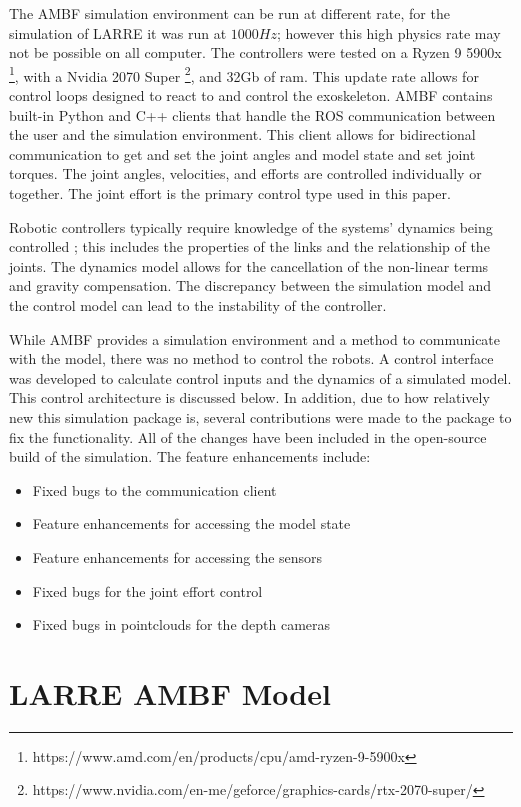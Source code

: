  
  The AMBF simulation environment can be run at different rate, for the simulation of LARRE it was run at $1000Hz$; however this high physics rate may not be possible on all computer. The controllers were tested on a Ryzen 9 5900x \footnote{https://www.amd.com/en/products/cpu/amd-ryzen-9-5900x}, with a Nvidia 2070 Super \footnote{https://www.nvidia.com/en-me/geforce/graphics-cards/rtx-2070-super/}, and 32Gb of ram. This update rate allows for control loops designed to react to and control the exoskeleton. AMBF contains built-in Python and C++ clients that handle the ROS communication between the user and the simulation environment. This client allows for bidirectional communication to get and set the joint angles and model state and set joint torques. The joint angles, velocities, and efforts are controlled individually or together. The joint effort is the primary control type used in this paper. 
 
Robotic controllers typically require knowledge of the systems' dynamics being controlled \cite{piltan2012design}; this includes the properties of the links and the relationship of the joints. The dynamics model allows for the cancellation of the non-linear terms and gravity compensation. The discrepancy between the simulation model and the control model can lead to the instability of the controller. 
 
 While AMBF provides a simulation environment and a method to communicate with the model, there was no method to control the robots. A control interface was developed to calculate control inputs and the dynamics of a simulated model. This control architecture is discussed below. In addition, due to how relatively new this simulation package is, several contributions were made to the package to fix the functionality. All of the changes have been included in the open-source build of the simulation. The feature enhancements include:
 \begin{itemize}
     \item Fixed bugs to the communication client
     \item Feature enhancements for accessing the model state
     \item Feature enhancements for accessing the sensors 
     \item Fixed bugs for the joint effort control
     \item Fixed bugs in pointclouds for the depth cameras
 \end{itemize}
 
 \section{LARRE AMBF Model}
 
